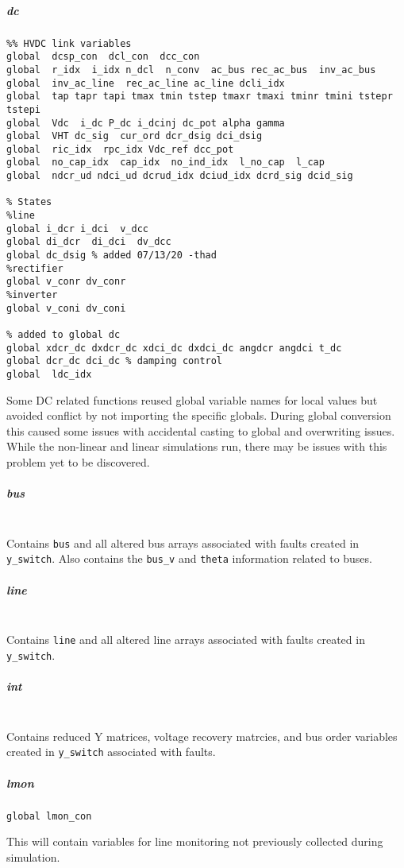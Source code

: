 \documentclass[12pt]{article}
\begin{document}
\subparagraph{dc}
\begin{verbatim}
%% HVDC link variables 
global  dcsp_con  dcl_con  dcc_con
global  r_idx  i_idx n_dcl  n_conv  ac_bus rec_ac_bus  inv_ac_bus
global  inv_ac_line  rec_ac_line ac_line dcli_idx
global  tap tapr tapi tmax tmin tstep tmaxr tmaxi tminr tmini tstepr tstepi
global  Vdc  i_dc P_dc i_dcinj dc_pot alpha gamma 
global  VHT dc_sig  cur_ord dcr_dsig dci_dsig
global  ric_idx  rpc_idx Vdc_ref dcc_pot
global  no_cap_idx  cap_idx  no_ind_idx  l_no_cap  l_cap
global  ndcr_ud ndci_ud dcrud_idx dciud_idx dcrd_sig dcid_sig

% States
%line
global i_dcr i_dci  v_dcc
global di_dcr  di_dci  dv_dcc
global dc_dsig % added 07/13/20 -thad
%rectifier
global v_conr dv_conr
%inverter
global v_coni dv_coni

% added to global dc
global xdcr_dc dxdcr_dc xdci_dc dxdci_dc angdcr angdci t_dc
global dcr_dc dci_dc % damping control
global  ldc_idx
\end{verbatim}
Some DC related functions reused global variable names for local values but avoided conflict by not importing the specific globals.
During global conversion this caused some issues with accidental casting to global and overwriting issues.
While the non-linear and linear simulations run, there may be issues with this problem yet to be discovered.

\subparagraph{bus} \ \\
Contains \verb|bus| and all altered bus arrays associated with faults created in \verb|y_switch|.
Also contains the \verb|bus_v| and \verb|theta| information related to buses.

\subparagraph{line} \ \\
Contains \verb|line| and all altered line arrays associated with faults created in \verb|y_switch|.

\subparagraph{int} \ \\
Contains reduced Y matrices, voltage recovery matrcies, and bus order variables created in \verb|y_switch| associated with faults.

\subparagraph{lmon}
\begin{verbatim}
global lmon_con
\end{verbatim}
This will contain variables for line monitoring not previously collected during simulation.


\begin{comment}

template for subparagraphs

\subparagraph{xxx}
\begin{verbatim}

\end{verbatim}




\end{comment}
\end{document}
